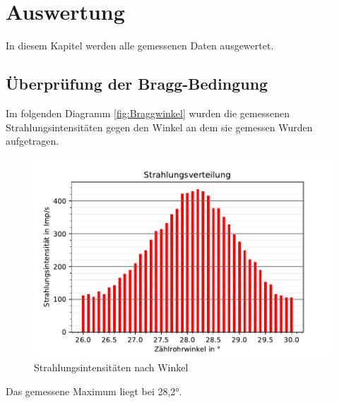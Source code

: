 \section{Auswertung}
\label{sec:Auswertung}
In diesem Kapitel werden alle gemessenen Daten ausgewertet.
\subsection{Überprüfung der Bragg-Bedingung}
\label{sec:Braggbedingung}
Im folgenden Diagramm \autoref{fig:Braggwinkel} wurden die gemessenen Strahlungsintensitäten 
gegen den Winkel an dem sie gemessen Wurden aufgetragen.
\begin{figure}
    \centering
    \includegraphics{Braggwinkel.pdf}
    \caption{Strahlungsintensitäten nach Winkel}
    \label{fig:Braggwinkel}
  \end{figure}
  Das gemessene Maximum liegt bei 28,2°.

